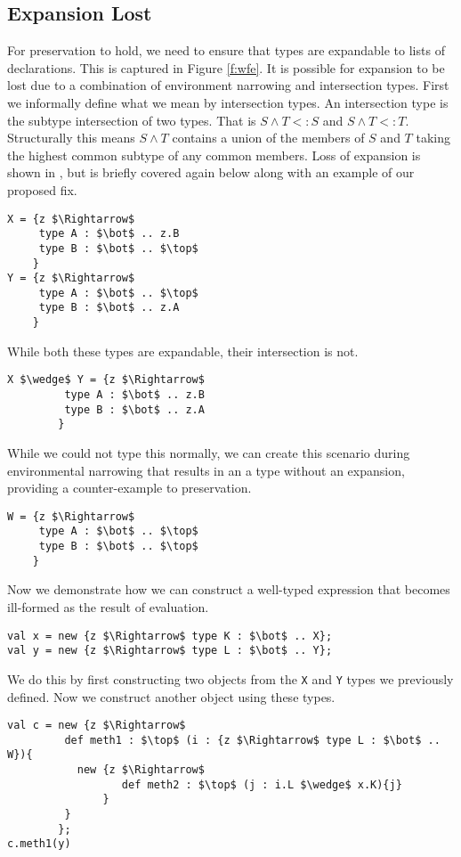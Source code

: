 \documentclass{llncs}
\numberwithin{subcase}{casethm}
\numberwithin{casethm}{theorem}
\numberwithin{casethm}{lemma}
\begin{document}
\subsection{Expansion Lost}
For preservation to hold, we need to ensure that types are expandable 
to lists of declarations. This is captured in Figure \ref{f:wfe}. It is 
possible for expansion to be lost due to a combination of environment 
narrowing and intersection types.
First we informally define what we mean by intersection types. An intersection 
type is the subtype intersection of two types. That is
$S \wedge T <: S$ and $S \wedge T <: T$. Structurally this means 
$S \wedge T$ contains a union of the members of $S$ and $T$ taking the 
highest common subtype of any common members. 
Loss of expansion is 
shown in \cite{Amin:2012}, but is briefly covered again below along with 
an example of our proposed fix.
\begin{lstlisting}[mathescape, style=custom_lang]
X = {z $\Rightarrow$
     type A : $\bot$ .. z.B
     type B : $\bot$ .. $\top$
    }
Y = {z $\Rightarrow$
     type A : $\bot$ .. $\top$
     type B : $\bot$ .. z.A
    }
\end{lstlisting}
While both these types are expandable, their intersection is not.
\begin{lstlisting}[mathescape, style=custom_lang]
X $\wedge$ Y = {z $\Rightarrow$
         type A : $\bot$ .. z.B
         type B : $\bot$ .. z.A
        }
\end{lstlisting}
While we could not type this normally, we can create this 
scenario during environmental narrowing that results in 
an a type without an expansion, providing a counter-example 
to preservation.
\begin{lstlisting}[mathescape, style=custom_lang]
W = {z $\Rightarrow$
     type A : $\bot$ .. $\top$
     type B : $\bot$ .. $\top$
    }
\end{lstlisting}
Now we demonstrate how we can construct a well-typed expression 
that becomes ill-formed as the result of evaluation.
\begin{lstlisting}[mathescape, style=custom_lang]
val x = new {z $\Rightarrow$ type K : $\bot$ .. X};
val y = new {z $\Rightarrow$ type L : $\bot$ .. Y};
\end{lstlisting}
We do this by first constructing two objects from the 
\texttt{X} and \texttt{Y} types we previously defined.
Now we construct another object using these types.
\begin{lstlisting}[mathescape, style=custom_lang]
val c = new {z $\Rightarrow$
         def meth1 : $\top$ (i : {z $\Rightarrow$ type L : $\bot$ .. W}){
           new {z $\Rightarrow$
                  def meth2 : $\top$ (j : i.L $\wedge$ x.K){j}
               }
         }
        };
c.meth1(y)
\end{lstlisting}
\end{document}
